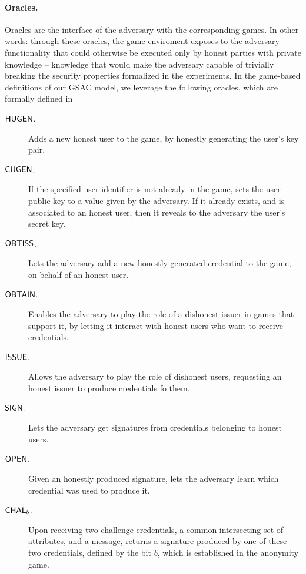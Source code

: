 \paragraph{Oracles.} %
Oracles are the interface of the adversary with the corresponding games. In
other words: through these oracles, the game enviroment exposes to the adversary
functionality that could otherwise be executed only by honest parties with
private knowledge -- knowledge that would make the adversary capable of
trivially breaking the security properties formalized in the experiments.
In the game-based definitions of our GSAC model, we leverage the following
oracles, which are formally defined in 

\begin{description}
\item[$\mathsf{HUGEN}$.] Adds a new honest user to the game, by honestly generating
  the user's key pair.
\item[$\mathsf{CUGEN}$.] If the specified user identifier is not already in the game,
  sets the user public key to a value given by the adversary. If it already
  exists, and is associated to an honest user, then it reveals to the adversary
  the user's secret key.
\item[$\mathsf{OBTISS}$.] Lets the adversary add a new honestly generated credential to
  the game, on behalf of an honest user.
\item[$\mathsf{OBTAIN}$.] Enables the adversary to play the role of a dishonest issuer
  in games that support it, by letting it interact with honest users who want to
  receive credentials.
\item[$\mathsf{ISSUE}$.] Allows the adversary to play the role of dishonest users,
  requesting an honest issuer to produce credentials fo them.
\item[$\mathsf{SIGN}$.] Lets the adversary get signatures from credentials belonging
  to honest users.
\item[$\mathsf{OPEN}$.] Given an honestly produced signature, lets the adversary learn
  which credential was used to produce it.
\item[$\mathsf{CHAL}_b$.] Upon receiving two challenge credentials, a common intersecting
  set of attributes, and a message, returns a signature produced by one of these
  two credentials, defined by the bit $b$, which is established in the anonymity
  game.
\end{description}

